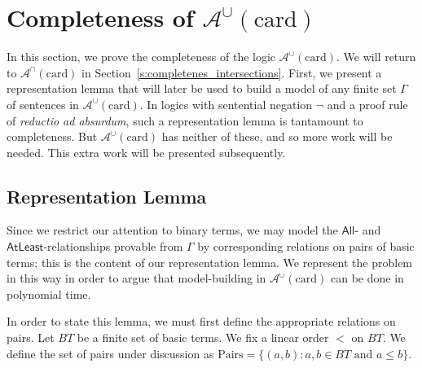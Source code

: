 \documentclass[letterpaper]{article} %
\theoremstyle{definition}
\newcommand{\set}[1]{\{ #1 \}}
\newcommand{\nott}{\neg}
\newcommand{\Aunion}{\mathscr{A}^{\cup}}
\newcommand{\Ainter}{\mathscr{A}^{\cap}}
\newcommand{\AllNoArgs}{\mathsf{All}}
\newcommand{\AtleastNoArgs}{\mathsf{AtLeast}}
\newcommand{\card}{\mathrm{card}}
\newcommand{\Pairs}{\mbox{Pairs}}
\begin{document}
\section{Completeness of $\Aunion(\card)$}\label{s:comp_Aunion(card)}
\label{section3}

In this section, we prove the completeness of the logic $\Aunion(\card)$.  We will return to $\Ainter(\card)$ in Section~\ref{s:completenes_intersections}. First, we present a representation lemma that will later be used to build a model of any finite set $\Gamma$ of sentences in $\Aunion(\card)$.
In logics with sentential negation $\nott$ and a proof rule of \emph{reductio ad absurdum}, such a representation lemma is tantamount to completeness.  But $\Aunion(\card)$ has neither of these, and so more work will be needed.  This extra work will be presented subsequently.


\subsection{Representation Lemma}
\label{subsection-representation}

Since we restrict our attention to binary terms, we may model the $\AllNoArgs$- and $\AtleastNoArgs$-relationships provable from $\Gamma$ by corresponding relations on pairs of basic terms; this is the content of our representation lemma.  We represent the problem in this way in order to argue that model-building in $\Aunion(\card)$ can be done in polynomial time.

In order to state this lemma, we must first define the appropriate relations on pairs.
Let $BT$ be a finite set of basic terms.  We fix a linear order $<$ on $BT$.
We define the set of pairs under discussion as $\Pairs = \set{(a, b) : a, b \in BT \textrm{ and } a \leq b}$.
\end{document}
